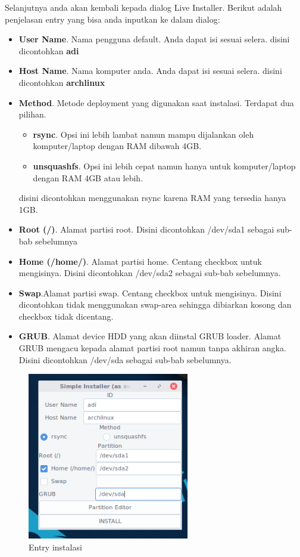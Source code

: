 \documentclass[12pt,]{article}
\begin{document}
	Selanjutnya anda akan kembali kepada dialog Live Installer.
	Berikut adalah penjelasan entry yang bisa anda inputkan ke dalam dialog:
	
	\begin{itemize}
		\item \textbf{User Name}. Nama pengguna default. Anda dapat isi sesuai selera. disini dicontohkan \textbf{adi}
		\item \textbf{Host Name}. Nama komputer anda. Anda dapat isi sesuai selera. disini dicontohkan \textbf{archlinux}
		\item \textbf{Method}. Metode deployment yang digunakan saat instalasi. Terdapat dua pilihan.
		\begin{itemize}
			\item \textbf{rsync}. Opsi ini lebih lambat namun mampu dijalankan oleh komputer/laptop dengan RAM dibawah 4GB.
			\item \textbf{unsquashfs}. Opsi ini lebih cepat namun hanya untuk komputer/laptop dengan RAM 4GB atau lebih.
		\end{itemize}
		disini dicontohkan menggunakan rsync karena RAM yang tersedia hanya 1GB.
		\item \textbf{Root (/)}. Alamat partisi root. Disini dicontohkan /dev/sda1 sebagai sub-bab sebelumnya
		\item \textbf{Home (/home/)}. Alamat partisi home. Centang checkbox untuk mengisinya.
		Disini dicontohkan /dev/sda2 sebagai sub-bab sebelumnya.
		\item \textbf{Swap}.Alamat partisi swap. Centang checkbox untuk mengisinya.
		Disini dicontohkan tidak menggunakan swap-area sehingga dibiarkan kosong dan checkbox tidak dicentang.
		\item \textbf{GRUB}. Alamat device HDD yang akan diinstal GRUB loader.
		Alamat GRUB mengacu kepada alamat partisi root namun tanpa akhiran angka. 
		Disini dicontohkan /dev/sda sebagai sub-bab sebelumnya.
	\end{itemize}

	\begin{figure}[!ht]
		\centering
		\includegraphics[width=200pt]{installhdd/step_16}
		\caption{Entry instalasi}
	\end{figure}
\end{document}
